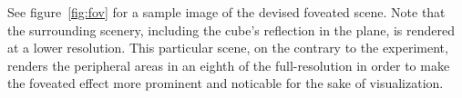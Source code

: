 See figure~\ref{fig:fov} for a sample image of the devised foveated scene.
Note that the surrounding scenery, including the cube's reflection in the plane, is rendered at a lower resolution.
This particular scene, on the contrary to the experiment, renders the peripheral areas in an eighth of the full-resolution in order to make the foveated effect more prominent and noticable for the sake of visualization.
